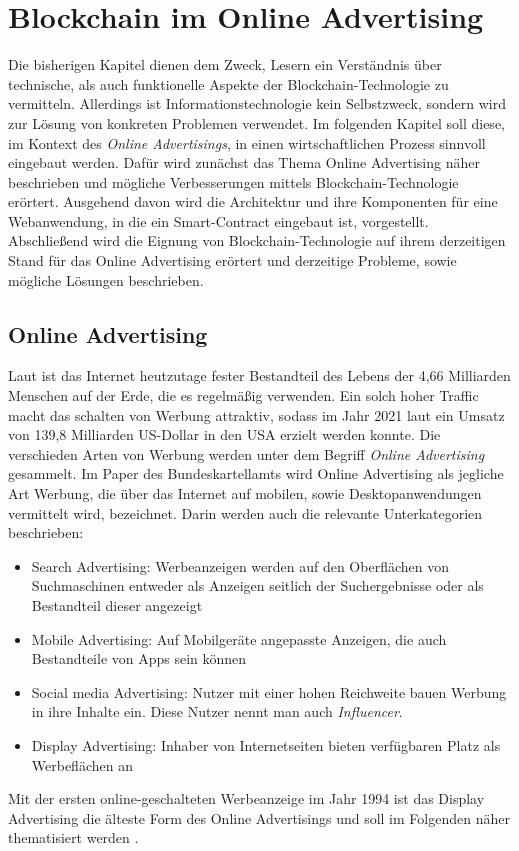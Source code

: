 \chapter{Blockchain im Online Advertising}
Die bisherigen Kapitel dienen dem Zweck, Lesern ein Verständnis über technische, als auch funktionelle Aspekte der Blockchain-Technologie zu vermitteln. Allerdings ist Informationstechnologie kein Selbstzweck, sondern wird zur Lösung von konkreten Problemen verwendet.
Im folgenden Kapitel soll diese, im Kontext des \emph{Online Advertisings}, in einen wirtschaftlichen Prozess sinnvoll eingebaut werden. 
Dafür wird zunächst das Thema Online Advertising näher beschrieben und mögliche Verbesserungen mittels Blockchain-Technologie erörtert. 
Ausgehend davon wird die Architektur und ihre Komponenten für eine Webanwendung, in die ein Smart-Contract eingebaut ist, vorgestellt. 
Abschließend wird die Eignung von Blockchain-Technologie auf ihrem derzeitigen Stand für das Online Advertising erörtert und derzeitige Probleme, sowie mögliche Lösungen beschrieben.
\section{Online Advertising}
Laut \cite{johnson_2021} ist das Internet heutzutage fester Bestandteil des Lebens der 4,66 Milliarden Menschen auf der Erde, die es regelmäßig verwenden. Ein solch hoher Traffic macht das schalten von Werbung attraktiv, sodass im Jahr 2021 laut \cite{statista_online_advertisement_revenue_2021} ein Umsatz von 139,8 Milliarden US-Dollar in den USA erzielt werden konnte. Die verschieden Arten von Werbung werden unter dem Begriff \emph{Online Advertising} gesammelt.
Im Paper \cite{bundeskartellamt_2018} des Bundeskartellamts wird Online Advertising als jegliche Art Werbung, die über das Internet auf mobilen, sowie Desktopanwendungen vermittelt wird, bezeichnet. Darin werden auch die relevante Unterkategorien beschrieben: 
\begin{itemize}
	\item Search Advertising: Werbeanzeigen werden auf den Oberflächen von Suchmaschinen entweder als Anzeigen seitlich der Suchergebnisse oder als Bestandteil dieser angezeigt
	\item Mobile Advertising: Auf Mobilgeräte angepasste Anzeigen, die auch Bestandteile von Apps sein können
	\item Social media Advertising:
	Nutzer mit einer hohen Reichweite bauen Werbung in ihre Inhalte ein. Diese Nutzer nennt man auch \emph{Influencer}.
	\item Display Advertising: Inhaber von Internetseiten bieten verfügbaren Platz als Werbeflächen an
\end{itemize}
Mit der ersten online-geschalteten Werbeanzeige im Jahr 1994 ist das Display Advertising die älteste Form des Online Advertisings und soll im Folgenden näher thematisiert werden \cite{bundeskartellamt_2018}.

